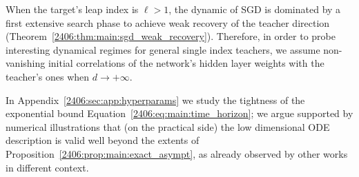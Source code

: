 \begin{remark}
When the target's leap index is $\ell>1$, the dynamic of SGD is dominated by a first extensive search phase to achieve weak recovery of the teacher direction (Theorem~\ref{2406:thm:main:sgd_weak_recovery}). 
Therefore, in order to probe interesting dynamical regimes for general single index teachers, we assume non-vanishing initial correlations of the network's hidden layer weights with the teacher's ones when \(d\to+\infty\).

In Appendix~\ref{2406:sec:app:hyperparams} we study the tightness of the exponential bound Equation~\eqref{2406:eq:main:time_horizon}; we argue supported by numerical illustrations that (on the practical side) the low dimensional ODE description is valid well beyond the extents of Proposition~\ref{2406:prop:main:exact_asympt}, as already observed by other works \cite{goldt2019dynamics,veiga2022phase} in different context. 
\end{remark}



